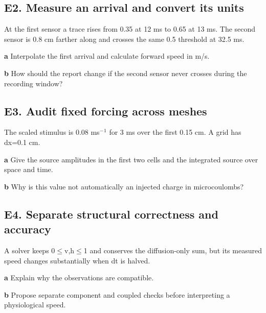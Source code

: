 \documentclass[11pt,letterpaper]{article}
\theoremstyle{definition}\newtheorem{definition}{Definition}\newtheorem{example}{Example}
\numberwithin{equation}{section}
\begin{document}
\par\noindent\begin{minipage}{\linewidth}
\subsection*{E2. Measure an arrival and convert its units}
At the first sensor a trace rises from 0.35 at 12 ms to 0.65 at 13 ms. The second sensor is 0.8 cm farther along and crosses the same 0.5 threshold at 32.5 ms.

\textbf{a} Interpolate the first arrival and calculate forward speed in m/s.

\end{minipage}\par\medskip
\textbf{b} How should the report change if the second sensor never crosses during the recording window?

\par\noindent\begin{minipage}{\linewidth}
\subsection*{E3. Audit fixed forcing across meshes}
The scaled stimulus is 0.08 ms$^-$$^1$ for 3 ms over the first 0.15 cm. A grid has dx=\allowbreak{}0.1 cm.

\textbf{a} Give the source amplitudes in the first two cells and the integrated source over space and time.

\end{minipage}\par\medskip
\textbf{b} Why is this value not automatically an injected charge in microcoulombs?

\par\noindent\begin{minipage}{\linewidth}
\subsection*{E4. Separate structural correctness and accuracy}
A solver keeps 0$\leq$v,h$\leq$1 and conserves the diffusion-only sum, but its measured speed changes substantially when dt is halved.

\textbf{a} Explain why the observations are compatible.

\end{minipage}\par\medskip
\textbf{b} Propose separate component and coupled checks before interpreting a physiological speed.
\end{document}
